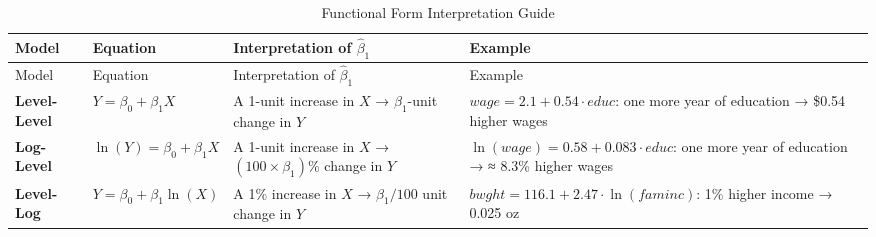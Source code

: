 \documentclass[
  letterpaper,
  DIV=11,
  numbers=noendperiod]{scrreprt}
\begin{document}
\begin{longtable}[]{@{}
  >{\raggedright\arraybackslash}p{}
  >{\raggedright\arraybackslash}p{}
  >{\raggedright\arraybackslash}p{}
  >{\raggedright\arraybackslash}p{}@{}}
\caption{Functional Form Interpretation
Guide}\label{tbl-functional-forms}\tabularnewline
\toprule\noalign{}
\begin{minipage}[b]{\linewidth}\raggedright
Model
\end{minipage} & \begin{minipage}[b]{\linewidth}\raggedright
Equation
\end{minipage} & \begin{minipage}[b]{\linewidth}\raggedright
Interpretation of \(\hat{\beta}_1\)
\end{minipage} & \begin{minipage}[b]{\linewidth}\raggedright
Example
\end{minipage} \\
\midrule\noalign{}
\endfirsthead
\toprule\noalign{}
\begin{minipage}[b]{\linewidth}\raggedright
Model
\end{minipage} & \begin{minipage}[b]{\linewidth}\raggedright
Equation
\end{minipage} & \begin{minipage}[b]{\linewidth}\raggedright
Interpretation of \(\hat{\beta}_1\)
\end{minipage} & \begin{minipage}[b]{\linewidth}\raggedright
Example
\end{minipage} \\
\midrule\noalign{}
\endhead
\bottomrule\noalign{}
\endlastfoot
\textbf{Level-Level} & \(Y = \beta_0 + \beta_1 X\) & A 1-unit increase
in \(X\) → \(\beta_1\)-unit change in \(Y\) &
\(wage = 2.1 + 0.54 \cdot educ\): one more year of education → \$0.54
higher wages \\
\textbf{Log-Level} & \(\ln(Y) = \beta_0 + \beta_1 X\) & A 1-unit
increase in \(X\) → \((100 \times \beta_1)\)\% change in \(Y\) &
\(\ln(wage) = 0.58 + 0.083 \cdot educ\): one more year of education → ≈
8.3\% higher wages \\
\textbf{Level-Log} & \(Y = \beta_0 + \beta_1 \ln(X)\) & A 1\% increase
in \(X\) → \(\beta_1 / 100\) unit change in \(Y\) &
\(bwght = 116.1 + 2.47 \cdot \ln(faminc)\): 1\% higher income → 0.025 oz

\end{longtable}
\end{document}

